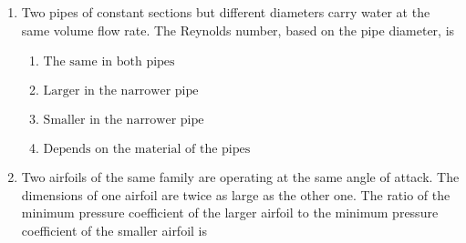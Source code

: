 \documentclass[journal]{IEEEtran}
\numberwithin{equation}{enumi}
\numberwithin{figure}{enumi}
\begin{document}
\begin{enumerate}
\begin{figure}[h]
    \caption{}
    \label{fig:9}
\end{figure}
\begin{multicols}{4}
    \begin{enumerate}
        \item $ \rho = \frac{E_A I_A + E_B I_B}{M} $
        \item $ \rho = \frac{E_B I_B + E_A I_A}{M} $
        \item $ \rho = \frac{M}{E_A I_A + E_B I_B} $
        \item $ \rho = \frac{(E_A + E_B)(I_A + I_B)}{M} $
    \end{enumerate}
\end{multicols}
\bigskip
\item Two pipes of constant sections but different diameters carry water at the same volume flow rate. The Reynolds number, based on the pipe diameter, is
\begin{multicols}{2}
    \begin{enumerate}
        \item $ \text{The same in both pipes} $
        \item $ \text{Larger in the narrower pipe} $
        \item $ \text{Smaller in the narrower pipe} $
        \item $ \text{Depends on the material of the pipes} $
    \end{enumerate}
\end{multicols}
\bigskip
\item Two airfoils of the same family are operating at the same angle of attack. The dimensions of one airfoil are twice as large as the other one. The ratio of the minimum pressure coefficient of the larger airfoil to the minimum pressure coefficient of the smaller airfoil is

\end{enumerate}
\end{document}
